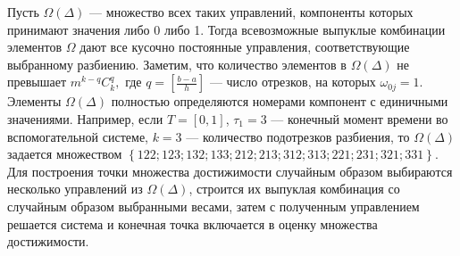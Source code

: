Пусть $\Omega(\Delta)$  --- множество всех таких управлений,
компоненты которых принимают значения либо 0 либо 1. Тогда
всевозможные выпуклые комбинации элементов $\Omega$ дают все
кусочно постоянные управления, соответствующие выбранному
разбиению. 
Заметим, что количество элементов в $\Omega(\Delta)$
не превышает  $m^{k-q} C_k^q,$ где $q=\left[\frac{b-a}{h}\right]$
--- число отрезков, на которых $\omega_{0j}=1$.
Элементы $\Omega(\Delta)$ полностью определяются номерами
компонент с единичными значениями. Например, если $T=[0,1]$,
$\tau_1=3$ --- конечный момент времени во вспомогательной системе,
$k=3$ --- количество подотрезков разбиения, то $\Omega(\Delta)$
задается множеством $\left\{122; 123 ; 132 ; 133  ;212 ; 213; 312
; 313 ; 221; 231 ; 321 ; 331   \right\}.$ Для построения точки
множества достижимости случайным образом выбираются несколько управлений из
$\Omega(\Delta)$, строится их выпуклая комбинация со случайным
образом выбранными весами, затем с полученным управлением решается
система и конечная точка включается в оценку множества достижимости.

